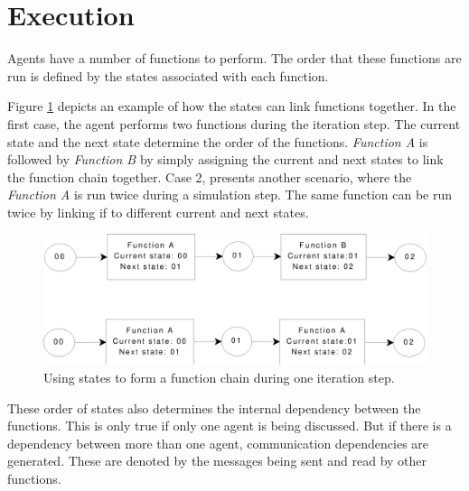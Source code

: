 \section{Execution}

Agents have a number of functions to perform. The order that these functions are run is defined by the states associated with each function.

Figure \ref{fig:functionstates} depicts an example of how the states
can link functions together. In the first case, the agent performs
two functions during the iteration step. The current state and the
next state determine the order of the functions. \emph{Function A}
is followed by \emph{Function B} by simply assigning the current and
next states to link the function chain together. Case 2, presents
another scenario, where the \emph{Function A} is run twice during a
simulation step. The same function can be run twice by linking if to
different current and next states.


\begin{figure}[!htb]
\begin{center}
  \includegraphics*[scale=0.4]{functionstates2.eps}
  \caption{Using states to form a function chain during one iteration step.}
  \label{fig:functionstates}
  \end{center}
\end{figure}

These order of states also determines the internal dependency
between the functions. This is only true if only one agent is being
discussed. But if there is a dependency between more than one agent,
communication dependencies are generated. These are denoted by the
messages being sent and read by other functions.



